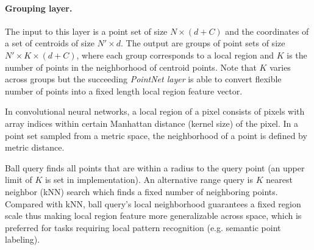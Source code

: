 

\vspace{-0.3cm}
\paragraph{Grouping layer.}
The input to this layer is a point set of size $N \times (d+C)$ and the coordinates of a set of centroids of size $N' \times d$. The output are groups of point sets of size $N' \times K \times (d+C)$, where each group corresponds to a local region and $K$ is the number of points in the neighborhood of centroid points. Note that $K$ varies across groups but the succeeding \emph{PointNet layer} is able to convert flexible number of points into a fixed length local region feature vector.

In convolutional neural networks, a local region of a pixel consists of pixels with array indices within certain Manhattan distance (kernel size) of the pixel. In a point set sampled from a metric space, the neighborhood of a point is defined by metric distance.

Ball query finds all points that are within a radius to the query point (an upper limit of $K$ is set in implementation). %
An alternative range query is $K$ nearest neighbor (kNN) search which finds a fixed number of neighboring points. Compared with kNN, ball query's local neighborhood guarantees a fixed region scale thus making local region feature more generalizable across space, which is preferred for tasks requiring local pattern recognition (e.g. semantic point labeling).

